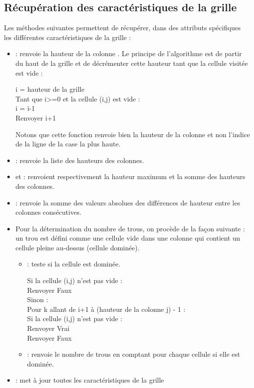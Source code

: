 \subsection{Récupération des caractéristiques de la grille}
Les méthodes suivantes permettent de récupérer, dans des attributs spécifiques les différentes caractéristiques de la grille :
\begin{itemize}
	\item {} : renvoie la hauteur de la colonne . Le principe de l'algorithme est de partir du haut de la grille et de décrémenter cette hauteur tant que la cellule visitée est vide :
	\begin{python}
		i = hauteur de la grille\\
		Tant que i>=0 et la cellule (i,j) est vide :\\
		i = i-1\\
		Renvoyer i+1 
	\end{python} 
	Notons que cette fonction renvoie bien la hauteur de la colonne et non l'indice de la ligne de la case la plus haute.
	\item {} : renvoie la liste des hauteurs des colonnes.
	\item {} et  : renvoient respectivement la hauteur maximum et la somme des hauteurs des colonnes.
	\item {} : renvoie la somme des valeurs absolues des différences de hauteur entre les colonnes consécutives.
	\item Pour la détermination du nombre de trous, on procède de la façon suivante : un trou est défini comme une cellule vide dans une colonne qui contient un cellule pleine au-dessus (cellule dominée).
		\begin{itemize}
			\item {} : teste si la cellule  est dominée.
			\begin{python}
				Si la cellule (i,j) n'est pas vide :\\
				Renvoyer Faux\\
				Sinon :\\
				Pour k allant de i+1 à (hauteur de la colonne j) - 1 :\\
				Si la cellule (i,j) n'est pas vide :\\
				Renvoyer Vrai\\
				Renvoyer Faux
			\end{python}
			\item {} : renvoie le nombre de trous en comptant pour chaque cellule si elle est dominée.
		\end{itemize}
	\item {} : met à jour toutes les caractéristiques de la grille
\end{itemize}

